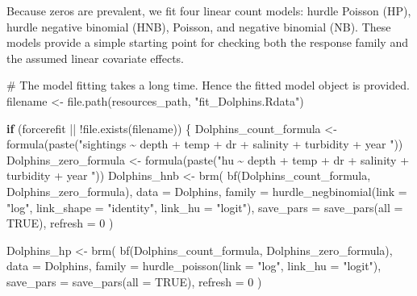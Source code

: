 \documentclass[
  english,
  letterpaper,
  DIV=11,
  numbers=noendperiod]{scrartcl}
\newenvironment{Shaded}{\begin{snugshade}}{\end{snugshade}}
\newcommand{\AttributeTok}[1]{\textcolor[rgb]{0.40,0.45,0.13}{#1}}
\newcommand{\CommentTok}[1]{\textcolor[rgb]{0.37,0.37,0.37}{#1}}
\newcommand{\ConstantTok}[1]{\textcolor[rgb]{0.56,0.35,0.01}{#1}}
\newcommand{\ControlFlowTok}[1]{\textcolor[rgb]{0.00,0.23,0.31}{\textbf{#1}}}
\newcommand{\DecValTok}[1]{\textcolor[rgb]{0.68,0.00,0.00}{#1}}
\newcommand{\FunctionTok}[1]{\textcolor[rgb]{0.28,0.35,0.67}{#1}}
\newcommand{\NormalTok}[1]{\textcolor[rgb]{0.00,0.23,0.31}{#1}}
\newcommand{\OtherTok}[1]{\textcolor[rgb]{0.00,0.23,0.31}{#1}}
\newcommand{\SpecialCharTok}[1]{\textcolor[rgb]{0.37,0.37,0.37}{#1}}
\newcommand{\StringTok}[1]{\textcolor[rgb]{0.13,0.47,0.30}{#1}}
\begin{document}
Because zeros are prevalent, we fit four linear count models: hurdle
Poisson (HP), hurdle negative binomial (HNB), Poisson, and negative
binomial (NB). These models provide a simple starting point for checking
both the response family and the assumed linear covariate effects.

\begin{Shaded}
\begin{Highlighting}[]
\CommentTok{\# The model fitting takes a long time. Hence the fitted model object is provided.}
\NormalTok{filename }\OtherTok{\textless{}{-}} \FunctionTok{file.path}\NormalTok{(resources\_path, }\StringTok{"fit\_Dolphins.Rdata"}\NormalTok{)}

\ControlFlowTok{if}\NormalTok{ (forcerefit }\SpecialCharTok{||} \SpecialCharTok{!}\FunctionTok{file.exists}\NormalTok{(filename)) \{}
\NormalTok{  Dolphins\_count\_formula }\OtherTok{\textless{}{-}} \FunctionTok{formula}\NormalTok{(}\FunctionTok{paste}\NormalTok{(}\StringTok{"sightings \textasciitilde{} depth + temp + dr + salinity + turbidity + year "}\NormalTok{))}
\NormalTok{  Dolphins\_zero\_formula  }\OtherTok{\textless{}{-}} \FunctionTok{formula}\NormalTok{(}\FunctionTok{paste}\NormalTok{(}\StringTok{"hu \textasciitilde{} depth + temp + dr + salinity + turbidity + year "}\NormalTok{))}
\NormalTok{  Dolphins\_hnb }\OtherTok{\textless{}{-}} \FunctionTok{brm}\NormalTok{(}
    \FunctionTok{bf}\NormalTok{(Dolphins\_count\_formula, Dolphins\_zero\_formula),}
    \AttributeTok{data   =}\NormalTok{ Dolphins,}
    \AttributeTok{family =} \FunctionTok{hurdle\_negbinomial}\NormalTok{(}\AttributeTok{link =} \StringTok{"log"}\NormalTok{, }\AttributeTok{link\_shape =} \StringTok{"identity"}\NormalTok{, }\AttributeTok{link\_hu =} \StringTok{"logit"}\NormalTok{),}
    \AttributeTok{save\_pars =} \FunctionTok{save\_pars}\NormalTok{(}\AttributeTok{all =} \ConstantTok{TRUE}\NormalTok{),}
    \AttributeTok{refresh   =} \DecValTok{0}
\NormalTok{  )}
  
\NormalTok{  Dolphins\_hp }\OtherTok{\textless{}{-}} \FunctionTok{brm}\NormalTok{(}
    \FunctionTok{bf}\NormalTok{(Dolphins\_count\_formula, Dolphins\_zero\_formula),}
    \AttributeTok{data   =}\NormalTok{ Dolphins,}
    \AttributeTok{family =} \FunctionTok{hurdle\_poisson}\NormalTok{(}\AttributeTok{link =} \StringTok{"log"}\NormalTok{, }\AttributeTok{link\_hu =} \StringTok{"logit"}\NormalTok{),}
    \AttributeTok{save\_pars =} \FunctionTok{save\_pars}\NormalTok{(}\AttributeTok{all =} \ConstantTok{TRUE}\NormalTok{),}
    \AttributeTok{refresh   =} \DecValTok{0}
\NormalTok{  )}
  

\end{Highlighting}
\end{Shaded}
\end{document}
